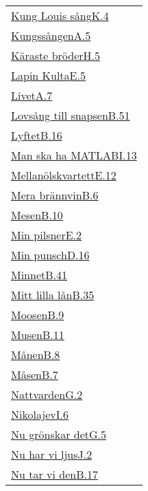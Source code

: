 \begin{longtable}[h]{@{}p{\linewidth}@{}}
  \hyperref[kingloui]{Kung Louis sång}\dotfill\hyperref[kingloui]{K.4}\\
  \hyperref[kungssangen]{Kungssången}\dotfill\hyperref[kungssangen]{A.5}\\
  \hyperref[karastebroder]{Käraste bröder}\dotfill\hyperref[karastebroder]{H.5}\\
  \hyperref[lapinkulta]{Lapin Kulta}\dotfill\hyperref[lapinkulta]{E.5}\\
  \hyperref[livet]{Livet}\dotfill\hyperref[livet]{A.7}\\
  \hyperref[lovsangtillsnapsen]{Lovsång till snapsen}\dotfill\hyperref[lovsangtillsnapsen]{B.51}\\
  \hyperref[lyftet]{Lyftet}\dotfill\hyperref[lyftet]{B.16}\\
  \hyperref[matlab]{Man ska ha MATLAB}\dotfill\hyperref[matlab]{I.13}\\
  \hyperref[mellanolskvartett]{Mellanölskvartett}\dotfill\hyperref[mellanolskvartett]{E.12}\\
  \hyperref[merabrannvin]{Mera brännvin}\dotfill\hyperref[merabrannvin]{B.6}\\
  \hyperref[mesen]{Mesen}\dotfill\hyperref[mesen]{B.10}\\
  \hyperref[minpilsner]{Min pilsner}\dotfill\hyperref[minpilsner]{E.2}\\
  \hyperref[minpunsch]{Min punsch}\dotfill\hyperref[minpunsch]{D.16}\\
  \hyperref[minnet]{Minnet}\dotfill\hyperref[minnet]{B.41}\\
  \hyperref[mittlillalan]{Mitt lilla lån}\dotfill\hyperref[mittlillalan]{B.35}\\
  \hyperref[moosen]{Moosen}\dotfill\hyperref[moosen]{B.9}\\
  \hyperref[musen]{Musen}\dotfill\hyperref[musen]{B.11}\\
  \hyperref[manen]{Månen}\dotfill\hyperref[manen]{B.8}\\
  \hyperref[masen]{Måsen}\dotfill\hyperref[masen]{B.7}\\
  \hyperref[nattvarden]{Nattvarden}\dotfill\hyperref[nattvarden]{G.2}\\
  \hyperref[nikolajev]{Nikolajev}\dotfill\hyperref[nikolajev]{I.6}\\
  \hyperref[nugronskardet]{Nu grönskar det}\dotfill\hyperref[nugronskardet]{G.5}\\
  \hyperref[nuharviljus]{Nu har vi ljus}\dotfill\hyperref[nuharviljus]{J.2}\\
  \hyperref[nutarviden]{Nu tar vi den}\dotfill\hyperref[nutarviden]{B.17}\\

\end{longtable}
